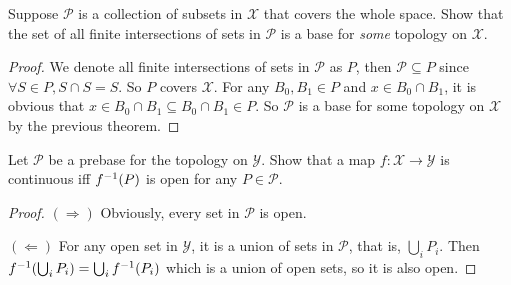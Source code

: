 \documentclass[./main.tex]{subfiles}
\begin{document}
\begin{definition}[Prebase]
  Suppose $\mathscr{P}$ is a collection of subsets in $\mathcal{X}$ that covers the whole space.
  Show that the set of all finite intersections of sets in $\mathscr{P}$ is a base for \textit{some}
  topology on $\mathcal{X}$.
\end{definition}
\begin{proof}
  We denote all finite intersections of sets in $\mathscr{P}$ as $P$,
  then $\mathscr{P} \subseteq P$ since $\forall S \in P, S \cap S = S$.
  So $P$ covers $\mathcal{X}$. For any $B_0, B_1 \in P$ and $x \in B_0 \cap B_1$,
  it is obvious that $x \in B_0 \cap B_1 \subseteq B_0 \cap B_1 \in P$.
  So $\mathscr{P}$ is a base for some topology on $\mathcal{X}$ by the previous theorem.
\end{proof}

\begin{theorem}
  Let $\mathscr{P}$ be a prebase for the topology on $\mathcal{Y}$. Show that
  a map $f : \mathcal{X} \rightarrow \mathcal{Y}$ is continuous iff
  $f^{-1}(P)$ is open for any $P \in \mathscr{P}$.
\end{theorem}
\begin{proof}
  $(\Rightarrow)$ Obviously, every set in $\mathscr{P}$ is open. \par
  $(\Leftarrow)$ For any open set in $\mathcal{Y}$, it is a union of sets in
  $\mathscr{P}$, that is, $\bigcup_i P_i$. Then $f^{-1}(\bigcup_i P_i) = \bigcup_i f^{-1}(P_i)$
  which is a union of open sets, so it is also open.
\end{proof}
\end{document}
